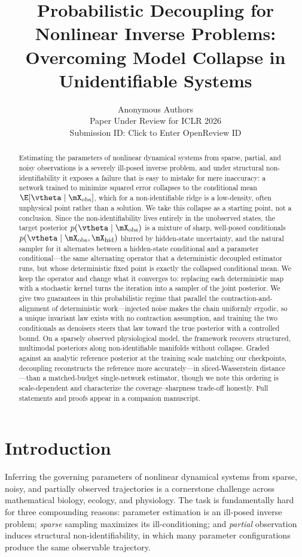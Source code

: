 \documentclass{article} %
\title{Probabilistic Decoupling for Nonlinear Inverse Problems: Overcoming Model Collapse in Unidentifiable Systems}
\author{Anonymous Authors \\
Paper Under Review for ICLR 2026 \\
Submission ID: Click to Enter OpenReview ID
}
\begin{document}
\maketitle

\begin{abstract}
Estimating the parameters of nonlinear dynamical systems from sparse, partial, and noisy observations is a severely ill-posed inverse problem, and under structural non-identifiability it exposes a failure that is easy to mistake for mere inaccuracy: a network trained to minimize squared error collapses to the conditional mean $\E[\vtheta \mid \mX_{\mathrm{obs}}]$, which for a non-identifiable ridge is a low-density, often unphysical point rather than a solution. We take this collapse as a starting point, not a conclusion. Since the non-identifiability lives entirely in the unobserved states, the target posterior $p(\vtheta \mid \mX_{\mathrm{obs}})$ is a mixture of sharp, well-posed conditionals $p(\vtheta \mid \mX_{\mathrm{obs}}, \mX_{\mathrm{hid}})$ blurred by hidden-state uncertainty, and the natural sampler for it alternates between a hidden-state conditional and a parameter conditional---the same alternating operator that a deterministic decoupled estimator runs, but whose deterministic fixed point is exactly the collapsed conditional mean. We keep the operator and change what it converges to: replacing each deterministic map with a stochastic kernel turns the iteration into a sampler of the joint posterior. We give two guarantees in this probabilistic regime that parallel the contraction-and-alignment of deterministic work---injected noise makes the chain uniformly ergodic, so a unique invariant law exists with no contraction assumption, and training the two conditionals as denoisers steers that law toward the true posterior with a controlled bound. On a sparsely observed physiological model, the framework recovers structured, multimodal posteriors along non-identifiable manifolds without collapse. Graded against an analytic reference posterior at the training scale matching our checkpoints, decoupling reconstructs the reference more accurately---in sliced-Wasserstein distance---than a matched-budget single-network estimator, though we note this ordering is scale-dependent and characterize the coverage--sharpness trade-off honestly. Full statements and proofs appear in a companion manuscript.
\end{abstract}

\section{Introduction}
\label{sec:intro}
Inferring the governing parameters of nonlinear dynamical systems from sparse, noisy, and partially observed trajectories is a cornerstone challenge across mathematical biology, ecology, and physiology. The task is fundamentally hard for three compounding reasons: parameter estimation is an ill-posed inverse problem; \emph{sparse} sampling maximizes its ill-conditioning; and \emph{partial} observation induces structural non-identifiability, in which many parameter configurations produce the same observable trajectory.
\end{document}
